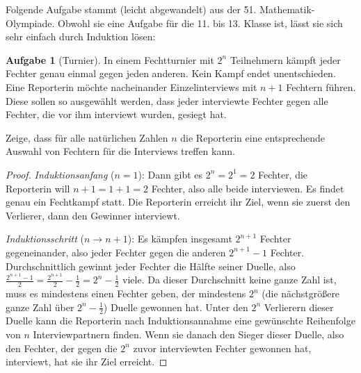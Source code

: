 \documentclass[a4paper,ngerman,12pt]{scrartcl}
\theoremstyle{definition}
\newtheorem*{aufg}{Aufgabe}
\begin{document}
Folgende Aufgabe stammt (leicht abgewandelt) aus der 51. Mathematik-Olympiade. Obwohl sie eine Aufgabe für die 11. bis 13. Klasse ist, lässt sie sich sehr einfach durch Induktion lösen:

\begin{aufg}[Turnier]
  In einem Fechtturnier mit $2^n$ Teilnehmern kämpft jeder Fechter genau einmal gegen jeden anderen. Kein Kampf endet unentschieden. Eine Reporterin möchte nacheinander Einzelinterviews mit $n+1$ Fechtern führen. Diese sollen so ausgewählt werden, dass jeder interviewte Fechter gegen alle Fechter, die vor ihm interviewt wurden, gesiegt hat.

  Zeige, dass für alle natürlichen Zahlen $n$ die Reporterin eine entsprechende Auswahl von Fechtern für die Interviews treffen kann.
\end{aufg}

\begin{proof}
  \emph{Induktionsanfang} ($n=1$): Dann gibt es $2^n = 2^1 = 2$ Fechter, die Reporterin will $n+1 = 1+1 = 2$ Fechter, also alle beide interviewen. Es findet genau ein Fechtkampf statt. Die Reporterin erreicht ihr Ziel, wenn sie zuerst den Verlierer, dann den Gewinner interviewt.

  \emph{Induktionsschritt} ($n \to n{+}1$): Es kämpfen insgesamt $2^{n+1}$ Fechter gegeneinander, also jeder Fechter gegen die anderen $2^{n+1} - 1$ Fechter. Durchschnittlich gewinnt jeder Fechter die Hälfte seiner Duelle, also $\frac{2^{n+1} - 1}{2} = \frac{2^{n+1}}{2} - \frac{1}{2} = 2^n - \frac{1}{2}$ viele. Da dieser Durchschnitt keine ganze Zahl ist, muss es mindestens einen Fechter geben, der mindestens $2^n$ (die nächstgrößere ganze Zahl über $2^n - \frac{1}{2}$) Duelle gewonnen hat. Unter den $2^n$ Verlierern dieser Duelle kann die Reporterin nach Induktionsannahme eine gewünschte Reihenfolge von $n$ Interviewpartnern finden. Wenn sie danach den Sieger dieser Duelle, also den Fechter, der gegen die $2^n$ zuvor interviewten Fechter gewonnen hat, interviewt, hat sie ihr Ziel erreicht.
\end{proof}

\begin{figure}
  \vspace{-15pt}
  \begin{center}
  \end{center}
  \vspace{-15pt}
\end{figure}
\end{document}
